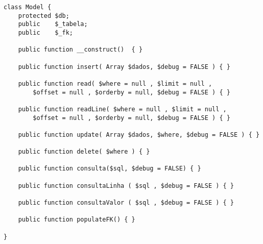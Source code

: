 \begin{lstlisting}
class Model {
    protected $db;
    public    $_tabela;
    public    $_fk;

    public function __construct()  { }

    public function insert( Array $dados, $debug = FALSE ) { }

    public function read( $where = null , $limit = null ,
        $offset = null , $orderby = null, $debug = FALSE ) { }

    public function readLine( $where = null , $limit = null ,
        $offset = null , $orderby = null, $debug = FALSE ) { }

    public function update( Array $dados, $where, $debug = FALSE ) { }

    public function delete( $where ) { }

    public function consulta($sql, $debug = FALSE) { }

    public function consultaLinha ( $sql , $debug = FALSE ) { }

    public function consultaValor ( $sql , $debug = FALSE ) { }

    public function populateFK() { }

}
\end{lstlisting}

